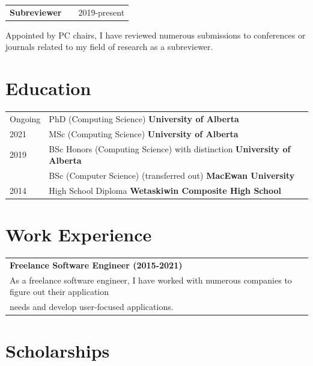\documentclass[a4paper,12pt]{article}
\makeatletter
\newenvironment{jobshort}[2]
    {
    \begin{tabularx}{\linewidth}{@{}l X r@{}}
    \textbf{#1} & \hfill &  #2 \\[3.75pt]
    \end{tabularx}
    }
    {
    }
\makeatother
\begin{document}
\begin{jobshort}{Subreviewer}{2019-present}
    Appointed by PC chairs, I have reviewed numerous submissions to conferences or journals related to my field of research as a subreviewer.
\end{jobshort}



\section{Education}
\begin{tabularx}{\linewidth}{@{}l X@{}}
Ongoing & PhD (Computing Science) \hfill \normalsize \textbf{University of Alberta} \\
2021 & MSc (Computing Science) \hfill \normalsize \textbf{University of Alberta} \\

2019 & BSc Honors (Computing Science) with distinction \hfill \textbf{University of Alberta} \\

 & BSc (Computer Science) (transferred out) \hfill \textbf{MacEwan University} \\

2014 & High School Diploma \hfill \textbf{Wetaskiwin Composite High School}  \\
\end{tabularx}

\section{Work Experience}
\begin{tabularx}{\linewidth}{@{}l X@{}}
\textbf{Freelance Software Engineer (2015-2021)} & \hfill \\[3.75pt]
As a freelance software engineer, I have worked with numerous companies to figure out their application\\ needs and develop user-focused applications.  \\
\end{tabularx}


\section{Scholarships}
\end{document}
